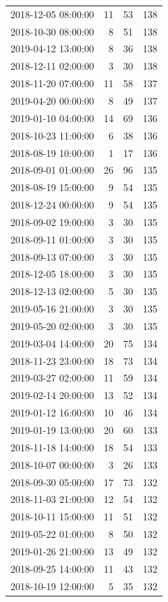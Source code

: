 \begin{tabular}{lrrr}
2018-12-05 08:00:00 & 11 & 53 & 138 \\
2018-10-30 08:00:00 & 8 & 51 & 138 \\
2019-04-12 13:00:00 & 8 & 36 & 138 \\
2018-12-11 02:00:00 & 3 & 30 & 138 \\
2018-11-20 07:00:00 & 11 & 58 & 137 \\
2019-04-20 00:00:00 & 8 & 49 & 137 \\
2019-01-10 04:00:00 & 14 & 69 & 136 \\
2018-10-23 11:00:00 & 6 & 38 & 136 \\
2018-08-19 10:00:00 & 1 & 17 & 136 \\
2018-09-01 01:00:00 & 26 & 96 & 135 \\
2018-08-19 15:00:00 & 9 & 54 & 135 \\
2018-12-24 00:00:00 & 9 & 54 & 135 \\
2018-09-02 19:00:00 & 3 & 30 & 135 \\
2018-09-11 01:00:00 & 3 & 30 & 135 \\
2018-09-13 07:00:00 & 3 & 30 & 135 \\
2018-12-05 18:00:00 & 3 & 30 & 135 \\
2018-12-13 02:00:00 & 5 & 30 & 135 \\
2019-05-16 21:00:00 & 3 & 30 & 135 \\
2019-05-20 02:00:00 & 3 & 30 & 135 \\
2019-03-04 14:00:00 & 20 & 75 & 134 \\
2018-11-23 23:00:00 & 18 & 73 & 134 \\
2019-03-27 02:00:00 & 11 & 59 & 134 \\
2019-02-14 20:00:00 & 13 & 52 & 134 \\
2019-01-12 16:00:00 & 10 & 46 & 134 \\
2019-01-19 13:00:00 & 20 & 60 & 133 \\
2018-11-18 14:00:00 & 18 & 54 & 133 \\
2018-10-07 00:00:00 & 3 & 26 & 133 \\
2018-09-30 05:00:00 & 17 & 73 & 132 \\
2018-11-03 21:00:00 & 12 & 54 & 132 \\
2018-10-11 15:00:00 & 11 & 51 & 132 \\
2019-05-22 01:00:00 & 8 & 50 & 132 \\
2019-01-26 21:00:00 & 13 & 49 & 132 \\
2018-09-25 14:00:00 & 11 & 43 & 132 \\
2018-10-19 12:00:00 & 5 & 35 & 132 \\

\end{tabular}
